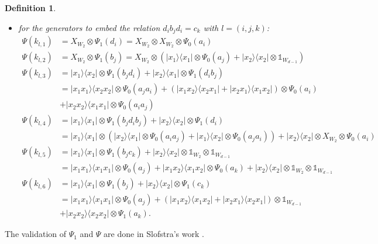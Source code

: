 \documentclass[11pt,letterpaper]{article}
\newcommand{\ketbra}[2]{|#1\rangle\langle#2|}
\newcommand{\x}{\otimes}
\newcommand{\1}{\mathbb{1}}
\newtheorem{definition}[theorem]{Definition}
\theoremstyle{definition}
\begin{document}
\begin{definition}
\begin{itemize}
\begin{align*}
	\Psi(k_{i,4}) &=  \ketbra{x_1}{x_1} \x \Psi_1(b_ic_i) + \ketbra{x_2}{x_2} \x \1_{W_2} \x \1_{W_{d-1}}\\
	&=\ketbra{x_1}{x_1} \x \1_{W_2} \x \Psi_0(a_i) +  \ketbra{x_2}{x_2} \x \1_{W_2} \x \1_{W_{d-1}}\\
	\Psi(k_{i,5}) &= \ketbra{x_1}{x_1} \x \Psi_1(b_i) + \ketbra{x_2}{x_2} \x \Psi_1(c_i) \\
	&=\ketbra{x_1x_1}{x_1x_1} \x \Psi_0(a_i) + (\ketbra{x_1x_2}{x_1x_2} + \ketbra{x_2x_1}{x_2x_1}) \x \1_{W_{d-1}}\\
	&+ \ketbra{x_2x_2}{x_2x_2} \x \Psi_0(a_i);
\end{align*}
\item for the generators to embed the relation $d_i b_j d_i = c_k$ with $l = (i,j,k)$:
\begin{align*}
	\Psi(k_{l,1}) &= X_{W_2} \x \Psi_1(d_i) = X_{W_2} \x X_{W_2} \x \Psi_0(a_{i}) \\
	\Psi(k_{l,2}) &= X_{W_2} \x \Psi_1(b_j) = X_{W_2} \x (\ketbra{x_1}{x_1} \x \Psi_0(a_j) + \ketbra{x_2}{x_2} \x \1_{W_{d-1}})\\
	\Psi(k_{l,3}) &= \ketbra{x_1}{x_2} \x  \Psi_1(b_jd_i) + \ketbra{x_2}{x_1} \x \Psi_1(d_ib_j)\\
	&= \ketbra{x_1x_1}{x_2x_2} \x \Psi_0(a_{j}a_{i}) + (\ketbra{x_1x_2}{x_2x_1} + \ketbra{x_2x_1}{x_1x_2}) \x \Psi_0(a_i)\\
	&+  \ketbra{x_2x_2}{x_1x_1} \x \Psi_0(a_{i}a_{j}) \\
	\Psi(k_{l,4}) &= \ketbra{x_1}{x_1} \x \Psi_1(b_jd_ib_j) + \ketbra{x_2}{x_2} \x  \Psi_1(d_i)\\
	&= \ketbra{x_1}{x_1} \x (\ketbra{x_2}{x_1} \x \Psi_0(a_ia_j)+ \ketbra{x_1}{x_2} \x \Psi_0(a_ja_i)) + \ketbra{x_2}{x_2} \x X_{W_2} \x \Psi_0(a_i)\\
	\Psi(k_{l,5}) &=  \ketbra{x_1}{x_1} \x \Psi_1(b_jc_k) + \ketbra{x_2}{x_2} \x \1_{W_2} \x \1_{W_{d-1}}\\
	&=  \ketbra{x_1x_1}{x_1x_1} \x \Psi_0(a_{j}) +  \ketbra{x_1x_2}{x_1x_2} \x \Psi_0(a_{k}) +  \ketbra{x_2}{x_2} \x \1_{W_2} \x \1_{W_{d-1}}\\
	\Psi(k_{l,6}) &= \ketbra{x_1}{x_1} \x \Psi_1(b_j) + \ketbra{x_2}{x_2} \x \Psi_1(c_{k})\\
	&=  \ketbra{x_1x_1}{x_1x_1} \x \Psi_0(a_{j}) + (\ketbra{x_1x_2}{x_1x_2} + \ketbra{x_2x_1}{x_2x_1})\x\1_{W_{d-1}}\\
	 &+ \ketbra{x_2x_2}{x_2x_2} \x \Psi_1(a_{k}).
\end{align*}
\end{itemize}
\end{definition}
The validation of $\Psi_1$ and $\Psi$ are done in Slofstra's work \cite{slofstra2017}.
\end{document}
